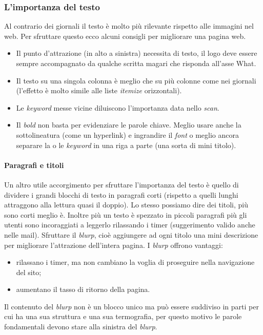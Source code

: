 		\subsubsection{L'importanza del testo}
			Al contrario dei giornali il testo è molto più rilevante rispetto alle immagini nel web. Per sfruttare questo ecco alcuni consigli per migliorare una pagina web.
			\begin{itemize}
				\item Il punto d'attrazione (in alto a sinistra) necessita di testo, il logo deve essere sempre accompagnato da qualche scritta magari che risponda all'asse What.
				\item Il testo su una singola colonna è meglio che su più colonne come nei giornali (l'effetto è molto simile alle liste \emph{itemize} orizzontali).
				\item Le \emph{keyword} messe vicine diluiscono l'importanza data nello \emph{scan}.
				\item Il \emph{bold} non basta per evidenziare le parole chiave. Meglio usare anche la sottolineatura (come un hyperlink) e ingrandire il \emph{font} o meglio ancora separare la o le \emph{keyword} in una riga a parte (una sorta di mini titolo).
			\end{itemize}
		
			\paragraph{Paragrafi e titoli}
				Un altro utile accorgimento per sfruttare l'importanza del testo è quello di dividere i grandi blocchi di testo in paragrafi corti (rispetto a quelli lunghi attraggono alla lettura quasi il doppio). Lo stesso possiamo dire dei titoli, più sono corti meglio è. Inoltre più un testo è spezzato in piccoli paragrafi più gli utenti sono incoraggiati a leggerlo rilassando i timer (suggerimento valido anche nelle mail).
				Sfruttare il \emph{blurp}, cioè aggiungere ad ogni titolo una mini descrizione per migliorare l'attrazione dell'intera pagina. I \emph{blurp} offrono vantaggi:
				\begin{itemize}
					\item rilassano i timer, ma non cambiano la voglia di proseguire nella navigazione del sito;
					\item aumentano il tasso di ritorno della pagina.
				\end{itemize}
				Il contenuto del \emph{blurp} non è un blocco unico ma può essere suddiviso in parti per cui ha una sua struttura e una sua termografia, per questo motivo le parole fondamentali devono stare alla sinistra del \emph{blurp}.
			

